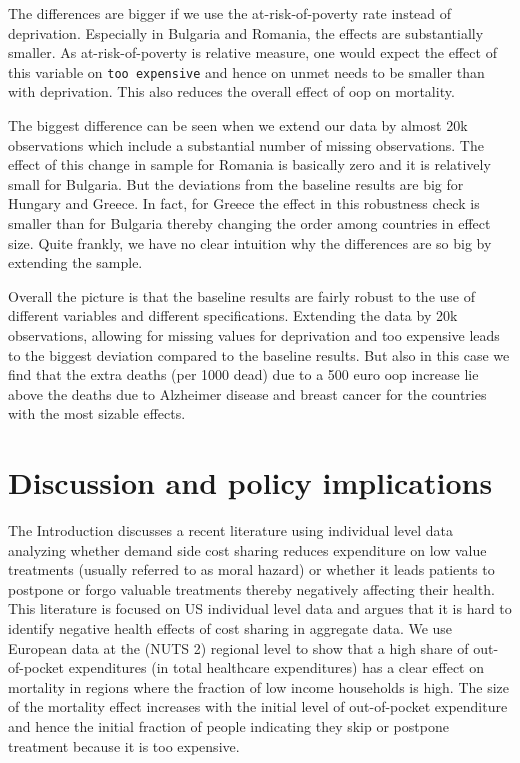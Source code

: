\documentclass[a4paper,12pt]{article}
\begin{document}
The differences are bigger if we use the at-risk-of-poverty rate instead of deprivation. Especially in Bulgaria and Romania, the effects are substantially smaller. As at-risk-of-poverty is relative measure, one would expect the effect of this variable on \texttt{too expensive} and hence on unmet needs to be smaller than with deprivation. This also reduces the overall effect of oop on mortality.

The biggest difference can be seen when we extend our data by almost 20k observations which include a substantial number of missing observations. The effect of this change in sample for Romania is basically zero and it is relatively small for Bulgaria. But the deviations from the baseline results are big for Hungary and Greece. In fact, for Greece the effect in this robustness check is smaller than for Bulgaria thereby changing the order among countries in effect size. Quite frankly, we have no clear intuition why the differences are so big by extending the sample.

Overall the picture is that the baseline results are fairly robust to the use of different variables and different specifications. Extending the data by 20k observations, allowing for missing values for deprivation and too expensive leads to the biggest deviation compared to the baseline results. But also in this case we find that the extra deaths (per 1000 dead) due to a 500 euro oop increase lie above the deaths due to Alzheimer disease and breast cancer for the countries with the most sizable effects.

\section{Discussion and policy implications}
\label{sec:orgc3109f3}

The Introduction discusses a recent literature using individual level data analyzing whether demand side cost sharing reduces expenditure on low value treatments (usually referred to as moral hazard) or whether it leads patients to postpone or forgo valuable treatments thereby negatively affecting their health. This literature is focused on US individual level data and argues that it is hard to identify negative health effects of cost sharing in aggregate data. We use European data at the (NUTS 2) regional level to show that a high share of out-of-pocket expenditures (in total healthcare expenditures) has a clear effect on mortality in regions where the fraction of low income households is high. The size of the mortality effect increases with the initial level of out-of-pocket expenditure and hence the initial fraction of people indicating they skip or postpone treatment because it is too expensive.
\end{document}
